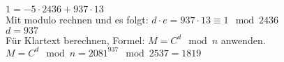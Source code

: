 \documentclass[12pt]{scrartcl}
\begin{document}
$1 = -5 \cdot 2436 + 937 \cdot 13$\\

Mit modulo rechnen und es folgt:
$d \cdot e = 937 \cdot 13 \equiv 1 \mod 2436$\\
$d = 937$\\

Für Klartext berechnen, Formel: $M = C^d \mod n$ anwenden.\\
$M = C^d \mod n = 2081^{937} \mod 2537 = 1819$










% 
\end{document}
